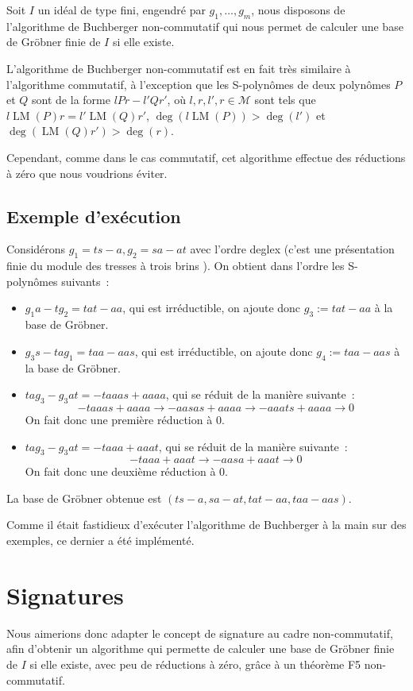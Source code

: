 \documentclass{article}
\newcommand{\M}{\mathcal{M}}
\DeclareMathOperator{\LM}{LM}
\begin{document}
Soit $I$ un idéal de type fini, engendré par $g_1, \dots, g_m$, nous disposons de l'algorithme de Buchberger non-commutatif qui nous permet de calculer une base de Gröbner finie de $I$ si elle existe. 

L'algorithme de Buchberger non-commutatif est en fait très similaire à l'algorithme commutatif, à l'exception que les S-polynômes de deux polynômes $P$ et $Q$ sont de la forme $lPr - l'Qr'$, où $l, r, l', r \in \M$ sont tels que $l\LM(P)r = l'\LM(Q)r'$, $\deg(l\LM(P)) > \deg(l')$ et $\deg(\LM(Q)r') > \deg(r)$.

Cependant, comme dans le cas commutatif, cet algorithme effectue des réductions à zéro que nous voudrions éviter.

\subsection*{Exemple d'exécution}

Considérons $g_1 = ts - a, g_2 = sa - at$ avec l'ordre deglex (c'est une présentation finie du module des tresses à trois brins \cite{tresses}).
On obtient dans l'ordre les S-polynômes suivants~:
\begin{itemize}
\item $g_1 a - t g_2 = tat - aa$, qui est irréductible, on ajoute donc $g_3 := tat - aa$ à la base de Gröbner.
\item $g_3 s - ta g_1 = taa - aas$, qui est irréductible, on ajoute donc $g_4 := taa - aas$ à la base de Gröbner.
\item $ta g_3 - g_3 at = -taaas + aaaa$, qui se réduit de la manière suivante~:
$$-taaas + aaaa \rightarrow -aasas + aaaa \rightarrow -aaats + aaaa \rightarrow 0$$
On fait donc une première réduction à $0$.
\item $ta g_3 - g_3 at = -taaa + aaat$, qui se réduit de la manière suivante~:
$$-taaa + aaat \rightarrow -aasa + aaat \rightarrow 0$$
On fait donc une deuxième réduction à $0$.
\end{itemize}
La base de Gröbner obtenue est $(ts - a, sa - at, tat - aa, taa - aas)$.

Comme il était fastidieux d'exécuter l'algorithme de Buchberger à la main sur des exemples, ce dernier a été implémenté.

\section*{Signatures}

Nous aimerions donc adapter le concept de signature au cadre non-commutatif, afin d'obtenir un algorithme qui permette de calculer une base de Gröbner finie de $I$ si elle existe, avec peu de réductions à zéro, grâce à un théorème F5 non-commutatif.
\end{document}
